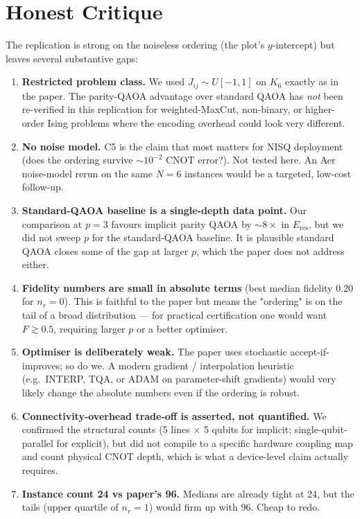\documentclass[11pt]{article}
\begin{document}
\section{Honest Critique}
The replication is strong on the noiseless ordering (the plot's
$y$-intercept) but leaves several substantive gaps:
\begin{enumerate}
\item \textbf{Restricted problem class.} We used
$J_{ij}\sim U[-1,1]$ on $K_6$ exactly as in the paper. The parity-QAOA
advantage over standard QAOA has \emph{not} been re-verified in this
replication for weighted-MaxCut, non-binary, or higher-order Ising
problems where the encoding overhead could look very different.
\item \textbf{No noise model.} C5 is the claim that most matters for
NISQ deployment (does the ordering survive $\sim 10^{-2}$ CNOT error?).
Not tested here. An Aer noise-model rerun on the same $N{=}6$ instances
would be a targeted, low-cost follow-up.
\item \textbf{Standard-QAOA baseline is a single-depth data point.}
Our comparison at $p{=}3$ favours implicit parity QAOA by $\sim 8\times$
in $E_{\mathrm{res}}$, but we did not sweep $p$ for the standard-QAOA
baseline. It is plausible standard QAOA closes some of the gap at
larger $p$, which the paper does not address either.
\item \textbf{Fidelity numbers are small in absolute terms} (best
median fidelity $0.20$ for $n_r{=}0$). This is faithful to the paper but
means the "ordering" is on the tail of a broad distribution --- for
practical certification one would want $F\gtrsim 0.5$, requiring larger
$p$ or a better optimiser.
\item \textbf{Optimiser is deliberately weak.} The paper uses stochastic
accept-if-improves; so do we. A modern gradient / interpolation heuristic
(e.g.\ INTERP, TQA, or ADAM on parameter-shift gradients) would very
likely change the absolute numbers even if the ordering is robust.
\item \textbf{Connectivity-overhead trade-off is asserted, not
quantified.} We confirmed the structural counts (5 lines $\times$ 5
qubits for implicit; single-qubit-parallel for explicit), but did not
compile to a specific hardware coupling map and count physical CNOT
depth, which is what a device-level claim actually requires.
\item \textbf{Instance count 24 vs paper's 96.} Medians are already tight
at 24, but the tails (upper quartile of $n_r{=}1$) would firm up with
$96$. Cheap to redo.
\end{enumerate}
\end{document}
